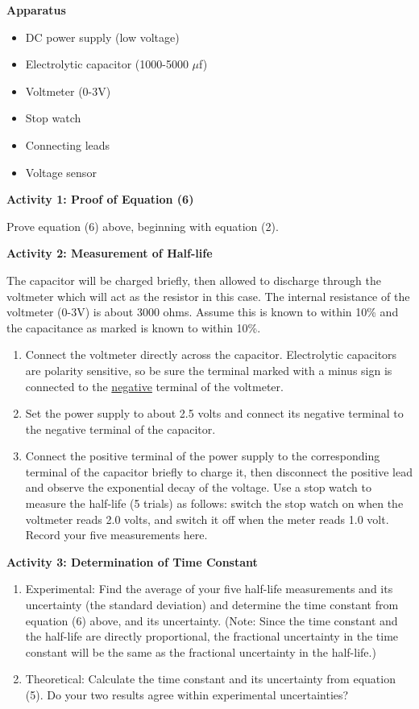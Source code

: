 \textbf{Apparatus}

\begin{itemize}
\item DC power supply (low voltage)
\item Electrolytic capacitor (1000-5000 $\mu$f)
\item Voltmeter (0-3V)
\item Stop watch
\item Connecting leads
\item Voltage sensor
\end{itemize}
\textbf{Activity 1: Proof of Equation (6)}

Prove equation (6) above, beginning with equation (2).
\vspace{3in}

\textbf{Activity 2: Measurement of Half-life}

The capacitor will be charged briefly, then allowed to discharge through the
voltmeter which will act as the resistor in this case. The internal resistance
of the voltmeter (0-3V) is about 3000 ohms.  Assume this is known to within
10\% and the capacitance as marked is known to within 10\%.

\begin{enumerate}
\item Connect the voltmeter directly across the capacitor.  Electrolytic
capacitors are polarity sensitive, so be sure the terminal marked with a minus
sign is connected to the \underline{negative} terminal of the voltmeter.

\item Set the power supply to about 2.5 volts and connect its negative terminal
to the negative terminal of the capacitor.

\item Connect the positive terminal of the power supply to the corresponding
terminal of the capacitor briefly to charge it, then disconnect the positive 
lead and observe the exponential decay of the voltage.  Use a stop watch to 
measure the half-life (5 trials) as follows: switch the stop watch on when the 
voltmeter reads 2.0 volts, and switch it off when the meter reads 1.0 volt. 
Record your five measurements here.\vspace{30mm}

\end{enumerate}

\textbf{Activity 3: Determination of Time Constant}

\begin{enumerate}
\item Experimental:  Find the average of your five half-life measurements and 
its uncertainty (the standard deviation) and determine the time constant from 
equation (6) above, and its uncertainty. (Note: Since the time constant and the 
half-life are directly proportional, the fractional uncertainty in the time 
constant will be the same as the fractional uncertainty in the half-life.)
\vspace{40mm}
\item Theoretical:  Calculate the time constant and its uncertainty from 
equation (5). Do your two results agree within experimental uncertainties?
\end{enumerate}

